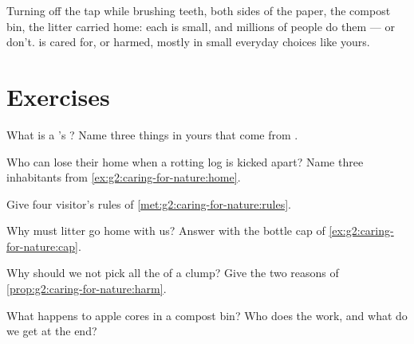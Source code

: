 \begin{remark}\label{rem:g2:caring-for-nature:count}
Turning off the tap while brushing teeth, both sides of the paper,
the compost bin, the litter carried home: each is small, and
millions of people do them --- or don't.  is cared for, or
harmed, mostly in small everyday choices like yours.
\end{remark}

\section{Exercises}

\begin{exercise}[$\star$]\label{exo:g2:caring-for-nature:1}
What is a 's ? Name three things in yours
that come from .
\end{exercise}

\begin{exercise}[$\star$]\label{exo:g2:caring-for-nature:2}
Who can lose their home when a rotting log is kicked apart? Name
three inhabitants from \cref{ex:g2:caring-for-nature:home}.
\end{exercise}

\begin{exercise}[$\star$]\label{exo:g2:caring-for-nature:3}
Give four visitor's rules of \cref{met:g2:caring-for-nature:rules}.
\end{exercise}

\begin{exercise}[$\star$]\label{exo:g2:caring-for-nature:4}
Why must litter go home with us? Answer with the bottle cap of
\cref{ex:g2:caring-for-nature:cap}.
\end{exercise}

\begin{exercise}[$\star$]\label{exo:g2:caring-for-nature:5}
Why should we not pick all the  of a clump? Give the two
reasons of \cref{prop:g2:caring-for-nature:harm}.
\end{exercise}

\begin{exercise}[$\star$]\label{exo:g2:caring-for-nature:6}
What happens to apple cores in a compost bin? Who does the work,
and what do we get at the end?
\end{exercise}


